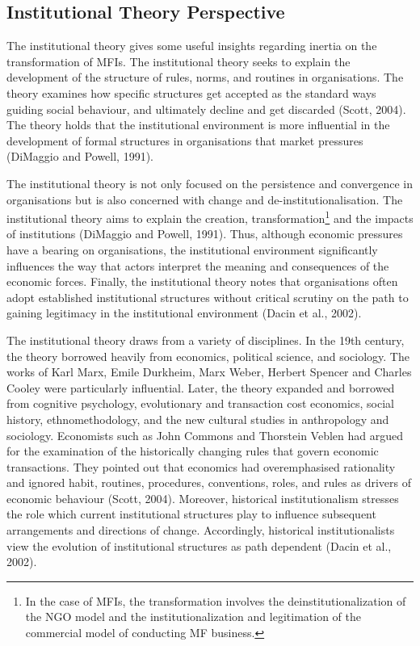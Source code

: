 \documentclass[a4paper, nobind]{templates/ociamthesis}
\begin{document}
\hypertarget{institutional-theory-perspective}{%
\subsection{Institutional Theory Perspective}\label{institutional-theory-perspective}}

\noindent The institutional theory gives some useful insights regarding inertia on the transformation of MFIs. The institutional theory seeks to explain the development of the structure of rules, norms, and routines in organisations. The theory examines how specific structures get accepted as the standard ways guiding social behaviour, and ultimately decline and get discarded (Scott, 2004). The theory holds that the institutional environment is more influential in the development of formal structures in organisations that market pressures (DiMaggio and Powell, 1991).

The institutional theory is not only focused on the persistence and convergence in organisations but is also concerned with change and de-institutionalisation. The institutional theory aims to explain the creation, transformation\footnote{In the case of MFIs, the transformation involves the deinstitutionalization of the NGO model and the institutionalization and legitimation of the commercial model of conducting MF business.} and the impacts of institutions (DiMaggio and Powell, 1991). Thus, although economic pressures have a bearing on organisations, the institutional environment significantly influences the way that actors interpret the meaning and consequences of the economic forces. Finally, the institutional theory notes that organisations often adopt established institutional structures without critical scrutiny on the path to gaining legitimacy in the institutional environment (Dacin et al., 2002).

The institutional theory draws from a variety of disciplines. In the 19th century, the theory borrowed heavily from economics, political science, and sociology. The works of Karl Marx, Emile Durkheim, Marx Weber, Herbert Spencer and Charles Cooley were particularly influential. Later, the theory expanded and borrowed from cognitive psychology, evolutionary and transaction cost economics, social history, ethnomethodology, and the new cultural studies in anthropology and sociology. Economists such as John Commons and Thorstein Veblen had argued for the examination of the historically changing rules that govern economic transactions. They pointed out that economics had overemphasised rationality and ignored habit, routines, procedures, conventions, roles, and rules as drivers of economic behaviour (Scott, 2004). Moreover, historical institutionalism stresses the role which current institutional structures play to influence subsequent arrangements and directions of change. Accordingly, historical institutionalists view the evolution of institutional structures as path dependent (Dacin et al., 2002).
\end{document}
